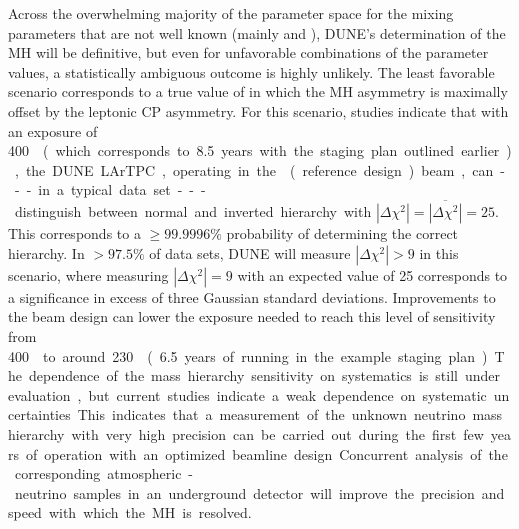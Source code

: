 Across the overwhelming majority of the parameter space for the mixing
parameters that are not well known (mainly \deltacp and ),
DUNE's determination of the MH will be definitive, but even for
unfavorable combinations of the parameter values, a statistically
ambiguous outcome is highly unlikely.  The least favorable scenario
corresponds to a true value of \deltacp in which the MH asymmetry is
maximally offset by the leptonic CP asymmetry.  
For this %
scenario, studies indicate that with an exposure of \SI{400}\ktMWyr{}  (which corresponds to \num{8.5} years with the staging plan outlined
earlier), the DUNE LArTPC, operating in the  
(reference design) beam, can --- in a typical data set --- distinguish
between normal and inverted hierarchy with $|\Delta \chi^2| =
\overline{|\Delta \chi^2|} = 25$.  This corresponds to a $\geq
99.9996\%$ probability of determining the correct hierarchy.  In
$>97.5\%$ of data sets, DUNE will measure $|\Delta \chi^2| > 9$ in
this scenario, where measuring $|\Delta\chi^2| = 9$ with an expected
value of \num{25} corresponds to a significance in excess of three
Gaussian standard deviations. Improvements to the beam design can
lower the exposure needed to reach this level of sensitivity from
\SI{400}\ktMWyr{} to around \SI{230}\ktMWyr{} (\num{6.5} years of
running in the example staging plan). The dependence of the mass
hierarchy sensitivity on systematics is still under evaluation, but
current studies indicate a weak dependence on systematic
uncertainties. This indicates that a measurement of the unknown
neutrino mass hierarchy with very high precision can be carried out
during the first few years of operation with an optimized beamline
design. Concurrent analysis of the corresponding atmospheric-neutrino
samples in an underground detector will improve the precision and
speed with which the MH is resolved.


